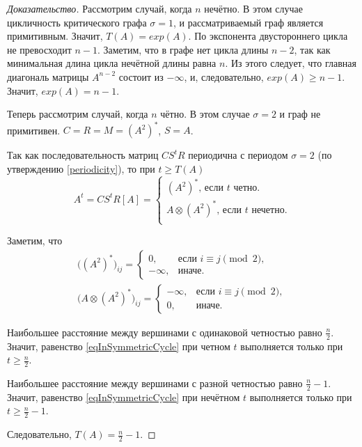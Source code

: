 \documentclass[12pt]{article}
\theoremstyle{definition}
\begin{document}
\begin{proof}[Доказательство]
Рассмотрим случай, когда $n$ нечётно. В этом случае цикличность критического графа $\sigma = 1$, и рассматриваемый граф является примитивным. Значит, $T(A) = exp(A)$. По \cite[теорема 3.1]{kLocalExponent} экспонента двустороннего цикла не превосходит $n - 1$. Заметим, что в графе нет цикла длины $n - 2$, так как минимальная длина цикла нечётной длины равна $n$. Из этого следует, что главная диагональ матрицы $A^{n - 2}$ состоит из $-\infty$, и, следовательно, $exp(A) \ge n - 1$. Значит, $exp(A) = n - 1$.

Теперь рассмотрим случай, когда $n$ чётно. В этом случае $\sigma = 2$ и граф не примитивен. $C = R = M = (A^2)^*$, $S = A$.

Так как последовательность матриц $CS^tR$ периодична с периодом $\sigma = 2$ (по утверждению \ref{periodicity}), то при $t \ge T(A)$ \begin{equation}
\label{eqInSymmetricCycle}
A^t = CS^tR[A] = \begin{cases}
(A^2)^* \text{, если } t \text{ четно.}\\
A \otimes (A^2)^*\text{, если } t \text{ нечетно.}\\
\end{cases}
\end{equation}

Заметим, что \begin{align*}
\big((A^2)^* \big)_{ij} = \begin{cases}
0, & \text{если } i \equiv j \pmod{2},  \\
-\infty, & \text{иначе.}
\end{cases} \\
\big(A \otimes (A^2)^* \big)_{ij} = \begin{cases}
-\infty, & \text{если } i \equiv j \pmod{2},  \\
0, & \text{иначе.}
\end{cases}
\end{align*}

Наибольшее расстояние между вершинами с одинаковой четностью равно $\frac{n}{2}$. Значит, равенство \ref{eqInSymmetricCycle} при четном $t$ выполняется только при $t \ge \frac{n}{2}$.

Наибольшее расстояние между вершинами с разной четностью равно $\frac{n}{2} - 1$. Значит, равенство \ref{eqInSymmetricCycle} при нечётном $t$ выполняется только при $t \ge \frac{n}{2} - 1$.

Следовательно, $T(A) = \frac{n}{2} - 1$.
\end{proof}
\end{document}
